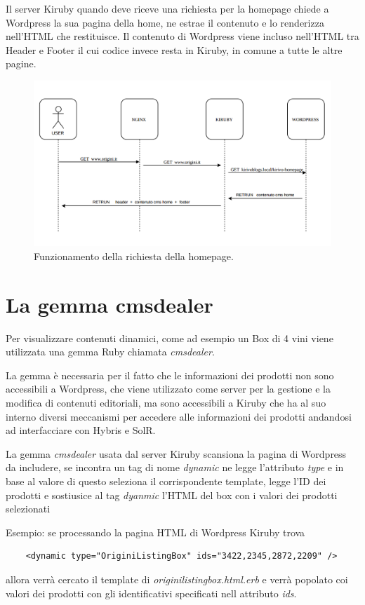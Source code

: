 \newpage

Il server Kiruby quando deve riceve una richiesta per la homepage chiede a Wordpress la sua pagina della home, ne estrae
il contenuto e lo renderizza nell'HTML che restituisce. Il contenuto di Wordpress viene incluso nell'HTML tra Header e Footer il cui codice invece resta in Kiruby, in comune a tutte le altre pagine.


\begin{figure}
  \includegraphics[width=\textwidth]{figure/homeseq.png}
  \caption{Funzionamento della richiesta della homepage.}
  \label{fig:homeseq}
\end{figure}



\section{La gemma cmsdealer}
Per visualizzare contenuti dinamici, come ad esempio un Box di 4 vini viene utilizzata
una gemma Ruby chiamata \emph{cmsdealer}.

La gemma è necessaria per il fatto che le informazioni dei prodotti non sono accessibili a Wordpress, che viene utilizzato
come server per la gestione e la modifica di contenuti editoriali, ma sono accessibili a Kiruby che ha al suo interno diversi
meccanismi per accedere alle informazioni dei prodotti andandosi ad interfacciare con Hybris e SolR.

La gemma \emph{cmsdealer} usata dal server Kiruby scansiona la pagina di Wordpress da includere,
se incontra un tag di nome \emph{dynamic} ne legge l'attributo \emph{type} e in base al valore di questo
seleziona il corrispondente template, legge l'ID dei prodotti e sostiusice al tag \emph{dyanmic} l'HTML del box con
i valori dei prodotti selezionati

Esempio: se processando la pagina HTML di Wordpress Kiruby trova
\begin{verbatim}
	<dynamic type="OriginiListingBox" ids="3422,2345,2872,2209" />
\end{verbatim}
allora verrà cercato il template di \emph{originilistingbox.html.erb} e verrà popolato
coi valori dei prodotti con gli identificativi specificati nell attributo \emph{ids}.


